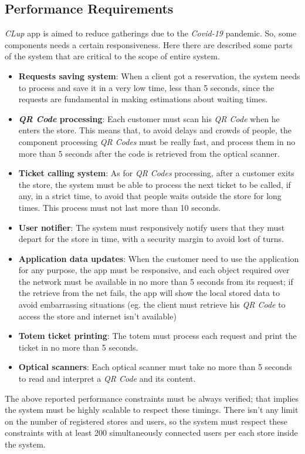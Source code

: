 \documentclass{article}
\begin{document}
	\subsection{Performance Requirements}
	\emph{CLup} app is aimed to reduce gatherings due to the \emph{Covid-19} pandemic. So, some components needs a certain responsiveness. Here there are described some parts of the system that are critical to the scope of entire system.
	\bigskip
	\begin{itemize}
		\item {\bfseries Requests saving system}: When a client got a reservation, the system needs to process and save it in a very low time, less than 5 seconds, since the requests are fundamental in making estimations about waiting times.
		\item {\bfseries \emph{QR Code} processing}: Each customer must scan his \emph{QR Code} when he enters the store. This means that, to avoid delays and crowds of people, the component processing \emph{QR Codes} must be really fast, and process them in no more than 5 seconds after the code is retrieved from the optical scanner.
		\item {\bfseries Ticket calling system}: As for \emph{QR Codes} processing, after a customer exits the store, the system must be able to process the next ticket to be called, if any, in a strict time, to avoid that people waits outside the store for long times. This process must not last more than 10 seconds.
		\item {\bfseries User notifier}: The system must responsively notify users that they must depart for the store in time, with a security margin to avoid lost of turns. 
		\item{\bfseries Application data updates}: When the customer need to use the application for any purpose, the app must be responsive, and each object required over the network must be available in no more than 5 seconds from its request; if the retrieve from the net fails, the app will show the local stored data to avoid embarrassing situations  (eg. the client must retrieve his \emph{QR Code} to access the store and internet isn't available) 
		\item{\bfseries Totem ticket printing}: The totem must process each request and print the ticket in no more than 5 seconds.
		\item{\bfseries Optical scanners}: Each optical scanner must take no more than 5 seconds to read and interpret a \emph{QR Code} and its content.
	\end{itemize} 
	\bigskip
	The above reported performance constraints must be always verified; that implies the system must be highly scalable to respect these timings. There isn't any limit on the number of registered stores and users, so the system must respect these constraints with at least 200 simultaneously connected users per each store inside the system.
\end{document}
